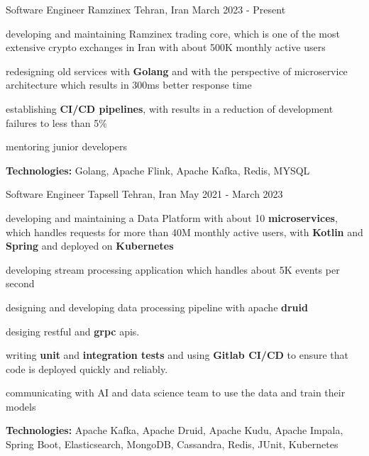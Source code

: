 

\begin{cventries}

  \cventry
    {Software Engineer} %
    {Ramzinex} %
    {Tehran, Iran} %
    {March 2023 - Present} %
    {
      \begin{cvitems} %
        \item developing and maintaining Ramzinex trading core, which is one of the most extensive crypto exchanges in Iran with about 500K monthly active users
        \item redesigning old services with \textbf{Golang} and with the perspective of microservice architecture which results in 300ms better response time
        \item establishing \textbf{CI/CD pipelines}, with results in a reduction of development failures to less than 5\%
        \item mentoring junior developers
        \item \textbf{Technologies:} Golang, Apache Flink, Apache Kafka, Redis, MYSQL
      \end{cvitems}
    }

    \cventry
    {Software Engineer} %
    {Tapsell} %
    {Tehran, Iran} %
    {May 2021 - March 2023} %
    {
      \begin{cvitems} %
        \item developing and maintaining a Data Platform with about 10 \textbf{microservices}, which handles requests for more than 40M monthly active users, with \textbf{Kotlin} and 
        \textbf{Spring} and deployed on \textbf{Kubernetes} 
        \item developing stream processing application which handles about 5K events per second
        \item designing and developing data processing pipeline with apache \textbf{druid}
        \item desiging restful and \textbf{grpc} apis.
        \item writing \textbf{unit} and \textbf{integration tests} and using \textbf{Gitlab CI/CD} to ensure that code is deployed quickly and reliably.        
        \item communicating with AI and data science team to use the data and train their models
        \item \textbf{Technologies:} Apache Kafka, Apache Druid, Apache Kudu, Apache Impala, Spring Boot, Elasticsearch, MongoDB, Cassandra, Redis, JUnit, Kubernetes
      \end{cvitems}
    }


\end{cventries}
